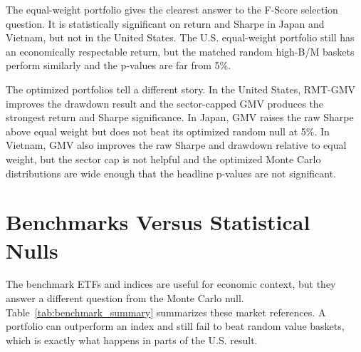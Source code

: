\documentclass[11pt,a4paper]{report}
\numberwithin{figure}{chapter}
\numberwithin{table}{chapter}
\numberwithin{equation}{chapter}
\begin{document}
The equal-weight portfolio gives the clearest answer to the F-Score selection question. It is statistically significant on return and Sharpe in Japan and Vietnam, but not in the United States. The U.S. equal-weight portfolio still has an economically respectable return, but the matched random high-B/M baskets perform similarly and the p-values are far from 5\%.

The optimized portfolios tell a different story. In the United States, RMT-GMV improves the drawdown result and the sector-capped GMV produces the strongest return and Sharpe significance. In Japan, GMV raises the raw Sharpe above equal weight but does not beat its optimized random null at 5\%. In Vietnam, GMV also improves the raw Sharpe and drawdown relative to equal weight, but the sector cap is not helpful and the optimized Monte Carlo distributions are wide enough that the headline p-values are not significant.

\section{Benchmarks Versus Statistical Nulls}

The benchmark ETFs and indices are useful for economic context, but they answer a different question from the Monte Carlo null. Table~\ref{tab:benchmark_summary} summarizes these market references. A portfolio can outperform an index and still fail to beat random value baskets, which is exactly what happens in parts of the U.S. result.
\end{document}

